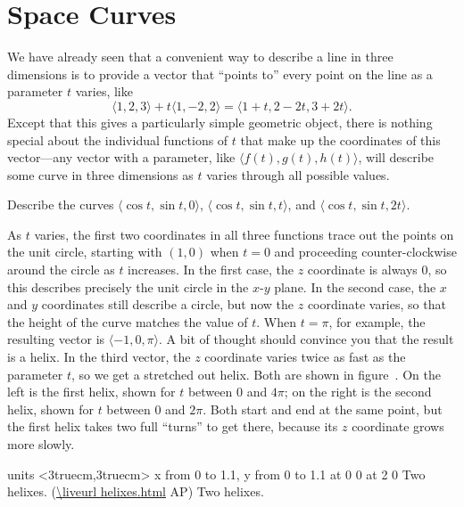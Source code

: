 \section{Space Curves}{}{}

We have already seen that a convenient way to describe a line in three
dimensions is to provide a vector that ``points to'' every point on
the line as a parameter $t$ varies, like
$$\langle 1,2,3\rangle+t\langle 1,-2,2\rangle
=\langle 1+t,2-2t,3+2t\rangle.$$
Except that this gives a particularly simple geometric object, there
is nothing special about the individual functions of $t$ that make up
the coordinates of this vector---any vector with a parameter, like
$\langle f(t),g(t),h(t)\rangle$, will describe some curve in three
dimensions as $t$ varies through all possible values. 

\example Describe the curves
$\langle \cos t,\sin t,0\rangle$,
$\langle \cos t,\sin t,t\rangle$, and
$\langle \cos t,\sin t,2t\rangle$.

As $t$ varies, the first two coordinates in all three functions
trace out the points on the unit circle, starting
with $(1,0)$ when $t=0$ and proceeding counter-clockwise around the
circle as $t$ increases. In the first case, the $z$ coordinate is
always 0, so this describes precisely the unit circle in the $x$-$y$
plane. In the second case, the $x$ and $y$ coordinates still describe
a circle, but now 
the $z$ coordinate varies, so that the
height of the curve matches the value of $t$. When $t=\pi$, for
example, the resulting vector is $\langle -1,0,\pi\rangle$. A bit of
thought should convince you that the result is a helix. In the third
vector, the $z$ coordinate varies twice as fast as the parameter $t$,
so we get a stretched out helix. Both are shown in
figure~. On the left is the first helix, shown for
$t$ between 0 and $4\pi$; on the right is the second helix, shown for
$t$ between 0 and $2\pi$. Both start and end at the same point, but
the first helix takes two full ``turns'' to get there, because its $z$
coordinate grows more slowly.
\endexample

\figure
\texonly
\vbox{\beginpicture
\normalgraphs
\ninepoint
\setcoordinatesystem units <3truecm,3truecm>
\setplotarea x from 0 to 1.1, y from 0 to 1.1
 at 0 0
 at 2 0
\endpicture}
\begincaption
Two helixes.
(\expandafter\url\expandafter{\liveurl helixes.html}%
AP\endurl)
\endcaption
\endtexonly
{}
\begincaption
Two helixes.
\endcaption
\endfigure


